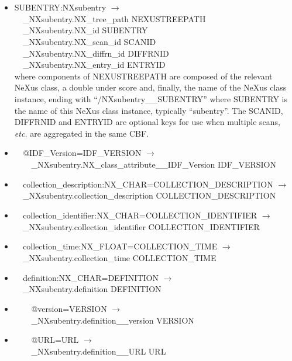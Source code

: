 \documentclass[11pt]{article}
\begin{document}
{{\begin{itemize}
\item{SUBENTRY:NXsubentry $\rightarrow$\\
\verb|  |\_NXsubentry.NX\_tree\_path    NEXUSTREEPATH \\
\verb|  |\_NXsubentry.NX\_id            SUBENTRY \\
\verb|  |\_NXsubentry.NX\_scan\_id      SCANID \\
\verb|  |\_NXsubentry.NX\_diffrn\_id    DIFFRNID \\
\verb|  |\_NXsubentry.NX\_entry\_id     ENTRYID \\
where components of NEXUSTREEPATH are composed of the
relevant NeXus class, a double under score and, finally, the
name of the NeXus class instance, ending with ``/NXsubentry\_\_SUBENTRY''
where SUBENTRY is the name of this NeXus class instance, typically ``subentry''.
The SCANID, DIFFRNID and ENTRYID are optional keys for use
when multiple scans, {\it etc.} are aggregated in the same CBF.}

\item{\verb|  |@IDF\_Version=IDF\_VERSION $\rightarrow$\\
\verb|    |\_NXsubentry.NX\_class\_attribute\_\_IDF\_Version IDF\_VERSION}

\item{\verb|  |collection\_description:NX\_CHAR=COLLECTION\_DESCRIPTION $\rightarrow$\\
\verb|  |\_NXsubentry.collection\_description COLLECTION\_DESCRIPTION}

\item{\verb|  |collection\_identifier:NX\_CHAR=COLLECTION\_IDENTIFIER $\rightarrow$\\
\verb|  |\_NXsubentry.collection\_identifier COLLECTION\_IDENTIFIER}

\item{\verb|  |collection\_time:NX\_FLOAT=COLLECTION\_TIME $\rightarrow$\\
\verb|  |\_NXsubentry.collection\_time COLLECTION\_TIME}

\item{\verb|  |definition:NX\_CHAR=DEFINITION $\rightarrow$\\
\verb|  |\_NXsubentry.definition DEFINITION}

\item{\verb|    |@version=VERSION $\rightarrow$\\
\verb|    |\_NXsubentry.definition\_\_version VERSION}

\item{\verb|    |@URL=URL $\rightarrow$\\
\verb|    |\_NXsubentry.definition\_\_URL URL}


\end{itemize}}}
\end{document}
